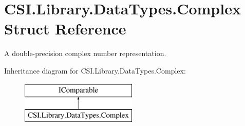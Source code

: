 \hypertarget{struct_c_s_i_1_1_library_1_1_data_types_1_1_complex}{}\section{C\+S\+I.\+Library.\+Data\+Types.\+Complex Struct Reference}
\label{struct_c_s_i_1_1_library_1_1_data_types_1_1_complex}


A double-\/precision complex number representation.  


Inheritance diagram for C\+S\+I.\+Library.\+Data\+Types.\+Complex\+:\begin{figure}[H]
\begin{center}
\leavevmode
\includegraphics[height=2.000000cm]{struct_c_s_i_1_1_library_1_1_data_types_1_1_complex}
\end{center}
\end{figure}
